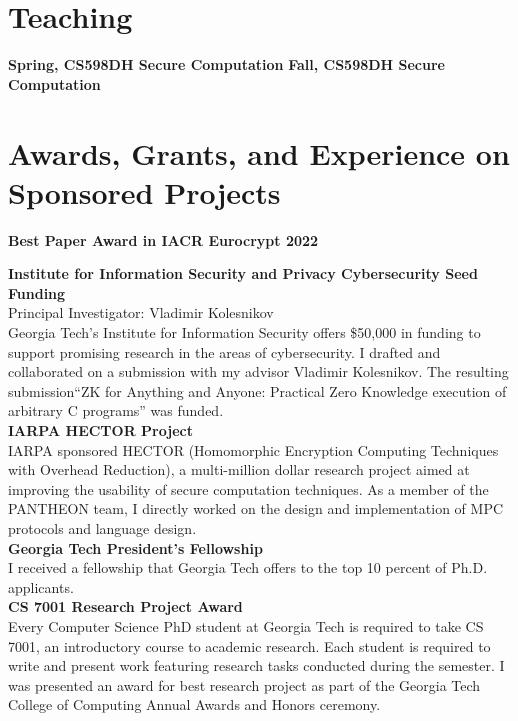 \documentclass[11pt]{article}
\begin{document}
{\section*{Teaching}

\textbf{Spring, CS598DH Secure Computation}
\textbf{Fall, CS598DH Secure Computation}

\section*{Awards, Grants, and Experience on Sponsored Projects}

\textbf{Best Paper Award in IACR Eurocrypt 2022}

\textbf{Institute for Information Security and Privacy Cybersecurity Seed Funding}\\
Principal Investigator: Vladimir Kolesnikov\\
Georgia Tech's Institute for Information Security offers \$50,000 in funding to support promising research in the areas of cybersecurity.
I drafted and collaborated on a submission with my advisor Vladimir Kolesnikov.
The resulting submission``ZK for Anything and Anyone: Practical Zero Knowledge execution of arbitrary C programs'' was funded.
\medskip\\


\textbf{IARPA HECTOR Project}\\
IARPA sponsored HECTOR (Homomorphic Encryption Computing Techniques with
Overhead Reduction), a multi-million dollar research project aimed at improving the usability of secure computation techniques.
As a member of the PANTHEON team, I directly worked on the design and implementation of MPC protocols and language design.
\medskip\\


\textbf{Georgia Tech President's Fellowship}\\
I received a fellowship that Georgia Tech offers to the top 10 percent of Ph.D. applicants.
\medskip\\


\textbf{CS 7001 Research Project Award}\\
Every Computer Science PhD student at Georgia Tech is required to
take CS 7001, an introductory course to academic research. Each
student is required to write and present work featuring research
tasks conducted during the semester. I was presented an award for
best research project as part of the Georgia Tech College of
Computing Annual Awards and Honors ceremony.

}
\end{document}
